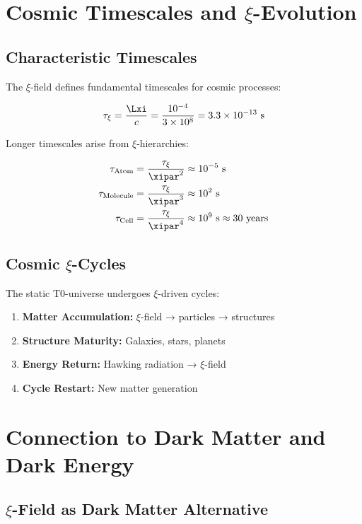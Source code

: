 	\section{Cosmic Timescales and $\xi$-Evolution}
	
	\subsection{Characteristic Timescales}
	
	The $\xi$-field defines fundamental timescales for cosmic processes:
	
	\begin{equation}
		\tau_\xi = \frac{\Lxi}{c} = \frac{10^{-4}}{3 \times 10^8} = 3.3 \times 10^{-13} \text{ s}
	\end{equation}
	
	Longer timescales arise from $\xi$-hierarchies:
	
	\begin{align}
		\tau_{\text{Atom}} &= \frac{\tau_\xi}{\xipar^2} \approx 10^{-5} \text{ s} \\
		\tau_{\text{Molecule}} &= \frac{\tau_\xi}{\xipar^3} \approx 10^2 \text{ s} \\
		\tau_{\text{Cell}} &= \frac{\tau_\xi}{\xipar^4} \approx 10^9 \text{ s} \approx 30 \text{ years}
	\end{align}
	
	\subsection{Cosmic $\xi$-Cycles}
	
	The static T0-universe undergoes $\xi$-driven cycles:
	
	\begin{enumerate}
		\item \textbf{Matter Accumulation:} $\xi$-field → particles → structures
		\item \textbf{Structure Maturity:} Galaxies, stars, planets
		\item \textbf{Energy Return:} Hawking radiation → $\xi$-field
		\item \textbf{Cycle Restart:} New matter generation
	\end{enumerate}
	
	\section{Connection to Dark Matter and Dark Energy}
	
	\subsection{$\xi$-Field as Dark Matter Alternative}
	

